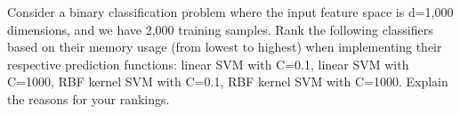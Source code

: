 Consider a binary classification problem where the input feature space is d=1,000 dimensions, and we have 2,000 training samples. Rank the following classifiers based on their memory usage (from lowest to highest) when implementing their respective prediction functions: linear SVM with C=0.1, linear SVM with C=1000, RBF kernel SVM with C=0.1, RBF kernel SVM with C=1000. Explain the reasons for your rankings.

